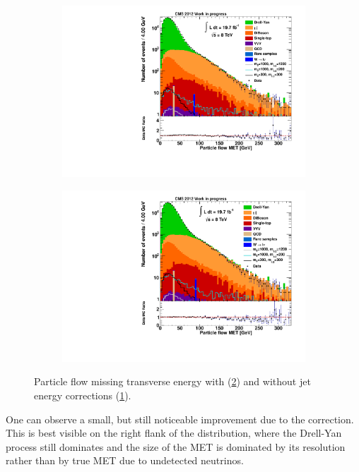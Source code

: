 \begin{figure}[htb!]
  \centering
  \begin{subfigure}[b]{0.495\textwidth}
    \centering
    \includegraphics[width=\textwidth]{plots/pfmet_nojer.pdf}
    \caption{\label{fig:jerpfmet_nojer}}
  \end{subfigure}
  \begin{subfigure}[b]{0.495\textwidth}
    \centering
    \includegraphics[width=\textwidth]{plots/pfmet.pdf}
    \caption{\label{fig:jerpfmet}}
  \end{subfigure}
  \caption{Particle flow missing transverse energy with (\ref{fig:jerpfmet}) and without jet energy corrections (\ref{fig:jerpfmet_nojer}).}
  \label{fig:jermet}
\end{figure}

\noindent One can observe a small, but still noticeable improvement due to the correction. This is best visible on the right flank of the distribution, where the Drell-Yan process still dominates and the size of the MET is dominated by its resolution rather than by true MET due to undetected neutrinos.


